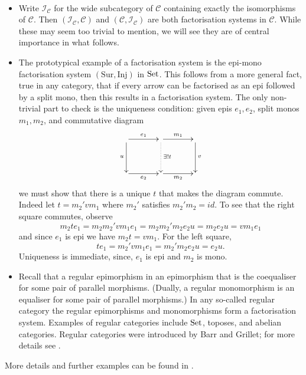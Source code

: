 \begin{examples} \label{ex.factsysts}\ 

  \begin{itemize}
    \item Write $\mathcal I_{\mathcal C}$ for the wide subcategory of
      $\mathcal C$ containing exactly the isomorphisms of $\mathcal C$. Then
      $(\mathcal I_{\mathcal C}, \mathcal C)$ and $(\mathcal C, \mathcal
      I_{\mathcal C})$ are both factorisation systems in $\mathcal C$. While
      these may seem too trivial to mention, we will see they are of central
      importance in what follows.
    
    \item The prototypical example of a factorisation system is the epi-mono
      factorisation system $(\mathrm{Sur},\mathrm{Inj})$ in $\mathrm{Set}$. This follows
      from a more general fact, true in any category, that if every arrow can be
      factorised as an epi followed by a split mono, then this results in a
      factorisation system.  The only non-trivial part to check is the
      uniqueness condition: given epis $e_1,e_2$, split monos $m_1,m_2$, and
      commutative diagram
      \[
	\xymatrixcolsep{3pc}
	\xymatrixrowsep{3pc}
	\xymatrix{
	  \ar[r]^{e_1} \ar[d]_u & \ar[r]^{m_1} \ar@{.>}[d]^{\exists! t} &
	  \ar[d]^v \\
	  \ar[r]_{e_2}& \ar[r]_{m_2} & 
	}
      \]
      we must show that there is a unique $t$ that makes the diagram commute.
      Indeed let $t= m_2'vm_1$ where $m_2'$ satisfies $m_2'm_2=id$. 
      To see that the right square commutes, observe
      \[
	m_2 t e_1 =  m_2 m_2' v m_1 e_1 = m_2 m_2' m_2 e_2 u = m_2 e_2 u = v m_1 e_1
      \]
      and since $e_1$ is epi we have $m_2 t = v m_1$. For the left square,
      \[
	t e_1 = m_2' v m_1 e_1 = m_2' m_2 e_2 u = e_2 u.
      \] 
      Uniqueness is immediate, since, $e_1$ is epi and $m_2$ is mono. 
    
    \item Recall that a regular epimorphism in an epimorphism that is the
      coequaliser for some pair of parallel morphisms. (Dually, a regular
      monomorphism is an equaliser for some pair of parallel morphisms.) In any
      so-called regular category the regular epimorphisms and monomorphisms form
      a factorisation system.  Examples of regular categories include $\mathrm{Set}$,
      toposes, and abelian categories. Regular categories were introduced by
      Barr and Grillet; for more details see \cite{Bar71,Gri71}.
\end{itemize}
More details and further examples can be found in \cite[]{AHS}.
\end{examples}

